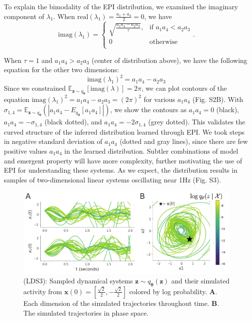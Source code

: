 \documentclass[11pt]{article}
\begin{document}
To explain the bimodality of the EPI distribution, we examined the imaginary component of $\lambda_1$.  When $\text{real}(\lambda_1) = \frac{a_1 + a_4}{2} = 0$, we have
\begin{equation}
\text{imag}(\lambda_1) = \begin{cases}
                             \sqrt{\frac{a_1 a_4 - a_2 a_3}{\tau}},  & \text{if } a_1 a_4 < a_2 a_3 \\
                             0 & \text{otherwise } \\
                         \end{cases}.
\end{equation}

When $\tau=1$ and $a_1 a_4 > a_2 a_3$ (center of distribution above), we have the following equation for the other two dimensions:
\begin{equation}
\text{imag}(\lambda_1)^2 = a_1 a_4 - a_2 a_3
\end{equation}
Since we constrained $\mathbb{E}_{\mathbf{z} \sim q_{\bm{\theta}}}\left[\text{imag}(\lambda)\right] = 2 \pi$, we can plot contours of the equation $\text{imag}(\lambda_1)^2 = a_1 a_4 - a_2 a_3 = (2 \pi)^2$ for various $a_1 a_4$ (Fig. S2B). 
With $\sigma_{1,4} = \mathbb{E}_{\mathbf{z} \sim q_{\bm{\theta}}}(|a_1 a_4 - E_{q_{\bm{\theta}}}[a_1 a_4]|)$, we show the contours as $a_1 a_4 = 0$ (black), $a_1 a_4 = -\sigma_{1,4}$ (black dotted), and $a_1 a_4 = -2\sigma_{1,4}$ (grey dotted). 
This validates the curved structure of the inferred distribution learned through EPI.  
We took steps in negative standard deviation of $a_1 a_4$ (dotted and gray lines), since there are few positive values $a_1 a_4$ in the learned distribution.  
Subtler combinations of model and emergent property will have more complexity, further motivating the use of EPI for understanding these systems.  
As we expect, the distribution results in samples of two-dimensional linear systems oscillating near 1Hz (Fig. S3).

\begin{figure}
\begin{center}
\includegraphics[scale=0.8]{figures/figLDS3/figLDS3.pdf}
\end{center}
\begin{flushleft}
\caption{\small (LDS3): Sampled dynamical systems $\mathbf{z} \sim q_{\bm{\theta}}(\mathbf{z})$ and their simulated activity from $\mathbf{x}(0) = [\frac{\sqrt{2}}{2}, -\frac{\sqrt{2}}{2}]$ colored by log probability. 
\textbf{A}. Each dimension of the simulated trajectories throughout time.  
\textbf{B}.  The simulated trajectories in phase space.}
\end{flushleft}
\label{fig:LDS3}
\end{figure}
\end{document}
